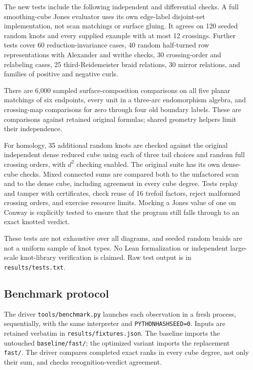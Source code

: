 \documentclass[11pt]{article}
\theoremstyle{remark}\newtheorem{remark}[theorem]{Remark}
\begin{document}
The new tests include the following independent and differential checks.
A full smoothing-cube Jones evaluator uses its own edge-label disjoint-set
implementation, not scan matchings or surface gluing. It agrees on 120
seeded random knots and every supplied example with at most 12 crossings.
Further tests cover 60 reduction-invariance cases, 40 random half-turned
row representations with Alexander and writhe checks, 30 crossing-order
and relabeling cases, 25 third-Reidemeister braid relations, 30 mirror
relations, and families of positive and negative curls.

There are 6,000 sampled surface-composition comparisons on all five planar
matchings of six endpoints, every unit in a three-arc endomorphism algebra,
and crossing-map comparisons for zero through four old boundary labels.
These are comparisons against retained original formulas; shared geometry
helpers limit their independence.

For homology, 35 additional random knots are checked against the original
independent dense reduced cube using each of three tail choices and random
full crossing orders, with $d^2$ checking enabled. The original suite has
its own dense-cube checks. Mixed connected sums are compared both to the
unfactored scan and to the dense cube, including agreement in every cube
degree. Tests replay and tamper with certificates, check reuse of 16
trefoil factors, reject malformed crossing orders, and exercise resource
limits. Mocking a Jones value of one on Conway is explicitly tested to
ensure that the program still falls through to an exact knotted verdict.

These tests are not exhaustive over all diagrams, and seeded random braids
are not a uniform sample of knot types. No Lean formalization or independent
large-scale knot-library verification is claimed. Raw test output is in
\texttt{results/tests.txt}.

\subsection{Benchmark protocol}
The driver \texttt{tools/benchmark.py} launches each observation in a fresh
process, sequentially, with the same interpreter and
\texttt{PYTHONHASHSEED=0}. Inputs are retained verbatim in
\texttt{results/fixtures.json}. The baseline imports the untouched
\texttt{baseline/fast/}; the optimized variant imports the replacement
\texttt{fast/}. The driver compares completed exact ranks in every cube
degree, not only their sum, and checks recognition-verdict agreement.
\end{document}
